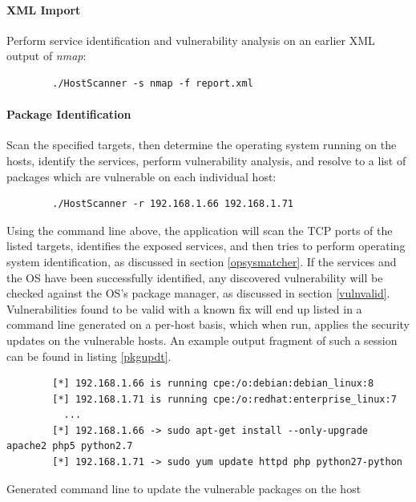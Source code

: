\documentclass[a4paper,12pt]{article}
\begin{document}
	\vspace{-0.4in}
	\paragraph*{XML Import} Perform service identification and vulnerability analysis on an earlier XML output of \textit{nmap}:

	\begin{listing}[H]
	\begin{verbatim}
		./HostScanner -s nmap -f report.xml
	\end{verbatim}
	\end{listing}
	
	\vspace{-0.4in}
	\paragraph*{Package Identification} Scan the specified targets, then determine the operating system running on the hosts, identify the services, perform vulnerability analysis, and resolve to a list of packages which are vulnerable on each individual host:

	\begin{listing}[H]
	\begin{verbatim}
		./HostScanner -r 192.168.1.66 192.168.1.71
	\end{verbatim}
	\end{listing}

	\vspace{-0.25in}
	Using the command line above, the application will scan the TCP ports of the listed targets, identifies the exposed services, and then tries to perform operating system identification, as discussed in section \ref{opsysmatcher}. If the services and the OS have been successfully identified, any discovered vulnerability will be checked against the OS's package manager, as discussed in section \ref{vulnvalid}. Vulnerabilities found to be valid with a known fix will end up listed in a command line generated on a per-host basis, which when run, applies the security updates on the vulnerable hosts. An example output fragment of such a session can be found in listing \ref{pkgupdt}.

	\begin{listing}[H]
		\begin{verbatim}
		[*] 192.168.1.66 is running cpe:/o:debian:debian_linux:8
		[*] 192.168.1.71 is running cpe:/o:redhat:enterprise_linux:7
		  ...
		[*] 192.168.1.66 -> sudo apt-get install --only-upgrade apache2 php5 python2.7
		[*] 192.168.1.71 -> sudo yum update httpd php python27-python
		\end{verbatim}
		\caption{Generated command line to update the vulnerable packages on the host}
		\label{pkgupdt}
	\end{listing}
\end{document}
